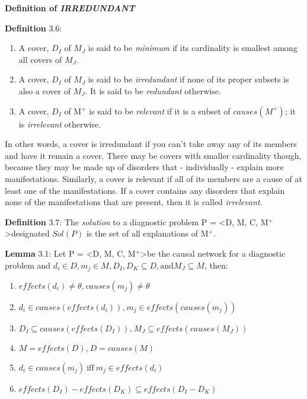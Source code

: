 \documentclass{article}
\begin{document}
\textbf{Definition of \textit{IRREDUNDANT}}
\newline
\par 
\textbf{Definition} 3.6: 
\begin{enumerate}
\item A cover, $D_I$ of $M_J$ is said to be \textit{minimum}
if its cardinality is smallest among all covers of $M_J$.
\item A cover, $D_I$ of $M_J$ is said to be \textit{irredundant} if none of its
proper subsets is also a cover of $M_J$. It is said to be \textit{redundant}
otherwise.
\item A cover, $D_I$ of M$^{+}$ is said to be \textit{relevant} if it is a
subset of $causes(M^{+})$; it is \textit{irrelevant} otherwise.
\end{enumerate}
\par
In other words, a cover is irredundant if you can't take away any of its
members and have it remain a cover.  There may be covers with smaller
cardinality though, because they may be made up of disorders that - individually
- explain more manifestations.  
\newline
Similarly, a cover is relevant if all of its members are a cause of at least
one of the manifestations. If a cover contains any disorders that explain none
of the manifestations that are present, then it is called \textit{irrelevant}.
\newline


\par 
\textbf{Definition} 3.7: The \textit{solution} to a diagnostic problem
P = \textless D, M, C, M$^{+}$\textgreater designated $Sol(P)$ is the set of all
explanations of M$^{+}$.
\newline

\par 
\textbf{Lemma} 3.1: Let P = \textless D, M, C, M$^{+}$\textgreater be the causal
network for a diagnostic problem and $d_i \in D, m_j \in M, D_I, D_K \subseteq
D, \text{and} M_J \subseteq M$, then:
\begin{enumerate}[label={(\alph*)}]
  \item $effects(d_i) \neq \theta\text{,}\  causes(m_j) \neq \theta$
  \item $d_i \in causes(effects(d_i))\text{,}\ m_j \in effects(causes(m_j))$
  \item $D_I \subseteq causes(effects(D_I))\text{,}\ M_J \subseteq
  effects(causes(M_J))$
  \item $M = effects(D)\text{,}\ D = causes(M)$
  \item $d_i \in causes(m_j)\  \text{iff}\  m_j \in effects(d_i)$
  \item $effects(D_I) - effects(D_K) \subseteq effects(D_I - D_K)$
\end{enumerate}
\end{document}
